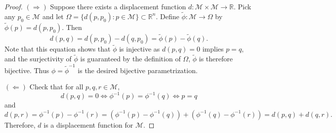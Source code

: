 \begin{proof}
    $(\Rightarrow)$ Suppose there exists a displacement function $d:\mathcal{M} \times \mathcal{M} \to \mathbb{R}$. Pick any $p_0 \in \mathcal{M}$ and let $\Omega = \{d(p, p_0): p \in \mathcal{M}\} \subset \mathbb{R}^n$. Define $\tilde{\phi}: \mathcal{M} \to \Omega$ by $\tilde{\phi}(p) = d(p, p_0)$. Then
    \begin{equation}
        d(p, q) = d(p, p_0) - d(q, p_0) = \tilde{\phi}(p)-\tilde{\phi}(q).
    \end{equation}
    Note that this equation shows that $\tilde{\phi}$ is injective as $d(p,q)=0$ implies $p=q$, and the surjectivity of $\tilde{\phi}$ is guaranteed by the definition of $\Omega$, $\tilde{\phi}$ is therefore bijective. 
    Thus $\phi = \tilde{\phi}^{-1}$ is the desired bijective parametrization.
    
    $(\Leftarrow)$ Check that for all $p, q, r \in \mathcal{M}$,
    $$d(p, q) = 0 \iff \phi^{-1}(p) = \phi^{-1}(q) \iff p=q$$
    and
    $$d(p, r) = \phi^{-1}(p) - \phi^{-1}(r) = (\phi^{-1}(p) - \phi^{-1}(q)) + (\phi^{-1}(q) - \phi^{-1}(r)) = d(p, q) + d(q, r).$$
    Therefore, $d$ is a displacement function for $\mathcal{M}$.
\end{proof}


